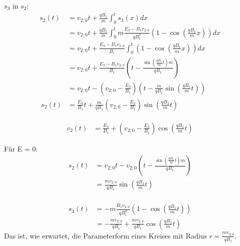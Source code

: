 \documentclass[german, a4paper, 10pt]{article}
\begin{document}
$s_3$ in $s_2$:
\begin{equation}
\begin{split}
s_2(t)  &= v_{2;0} t + \frac{q B_1}{m} \int_0^t s_3(x) dx	\\\
		&= v_{2;0} t + \frac{q B_1}{m} \int_0^t m \frac{E_3 - B_1 v_{2;0}}{q B_1^2} \left( 1 - \cos\left(\frac{q B_1}{m} x\right)\right) dx	\\\
		&= v_{2;0} t + \frac{E_3 - B_1 v_{2;0}}{B_1} \int_0^t \left( 1 - \cos\left(\frac{q B_1}{m} x\right)\right) dx	\\\
		&= v_{2;0} t + \frac{E_3 - B_1 v_{2;0}}{B_1} \left(t - \frac{\sin\left(\frac{q B_1}{m} t\right) m}{q B_1}\right) \\\
%
		&= v_{2;0} t - \left(v_{2;0} - \frac{E_3}{B_1}\right) \left(t - \frac{m}{q B_1} \sin\left(\frac{q B_1}{m} t\right) \right) \\\
%
s_2(t)	&= \frac{E_3}{B_1} t + \frac{m}{q B_1} \left(v_{2;0} - \frac{E_3}{B_1}\right) \sin\left(\frac{q B_1}{m} t\right)
\end{split}
\end{equation}

\begin{equation}
\begin{split}
v_2(t) &= \frac{E_3}{B_1} + \left(v_{2;0} - \frac{E_3}{B_1}\right) \cos\left(\frac{q B_1}{m} t\right)
\end{split}
\end{equation}

Für E = 0:
\begin{equation}
\begin{split}
s_2(t) 	&= v_{2;0} t - v_{2;0} \left(t - \frac{\sin\left(\frac{q B_1}{m} t\right) m}{q B_1}\right) \\\
		&= \frac{m v_{2;0}}{q B_1} \sin\left(\frac{q B_1}{m} t\right) \\\
\end{split}
\end{equation}

\begin{equation}
\begin{split}
s_3(t) 	&= -m \frac{B_1 v_{2;0}}{q B_1^2} \left( 1 - \cos\left(\frac{q B_1}{m} t\right)\right) \\\
		&= -\frac{m v_{2;0}}{q B_1} + \frac{m v_{2;0}}{q B_1} \cos\left(\frac{q B_1}{m} t\right)
\end{split}
\end{equation}
Das ist, wie erwartet, die Parameterform eines Kreises mit Radius $r = \frac{m v_{2;0}}{q B_1}$.
\end{document}
